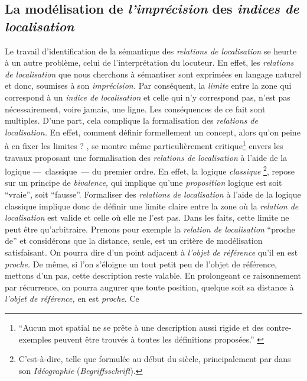 \subsection{La modélisation de \emph{l'imprécision} des \emph{indices
    de localisation}}
\label{subsec:2-1-2}

Le travail d'identification de la sémantique des \emph{relations de
  localisation} se heurte à un autre problème, celui de
l'interprétation du locuteur. En effet, les \emph{relations de
  localisation} que nous cherchons à sémantiser sont exprimées en
langage naturel et donc, soumises à son \emph{imprécision.} Par
conséquent, la \emph{limite} entre la zone qui correspond à un
\emph{indice de localisation} et celle qui n'y correspond pas, n'est
pas nécessairement, voire jamais, une ligne. Les conséquences de ce
fait sont multiples. D'une part, cela complique la formalisation des
\emph{relations de localisation.} En effet, comment définir
formellement un concept, alors qu'on peine à en fixer les limites ?
\textcite{Vandeloise1986}, se montre même particulièrement
critique\footnote{\enquote{Aucun mot spatial ne se prête à une
    description aussi rigide et des contre-exemples peuvent être
    trouvés à toutes les définitions proposées.}
  \autocite[p. 18]{Vandeloise1986}} envers les travaux proposant une
formalisation des \emph{relations de localisation} à l'aide de la
logique ---~classique~--- du premier ordre. En effet, la logique
\emph{classique} \footnote{C'est-à-dire, telle que formulée au début
  du  siècle, principalement par  dans son
  \emph{Idéographie} (\emph{Begriffsschrift}).}, repose sur un
principe de \emph{bivalence,} qui implique qu'une \emph{proposition}
logique est soit \enquote{vraie}, soit \enquote{fausse}. Formaliser
des \emph{relations de localisation} à l'aide de la logique classique
implique donc de définir une limite claire entre la zone où la
\emph{relation de localisation} est valide et celle où elle ne l'est
pas. Dans les faits, cette limite ne peut être qu'arbitraire. Prenons
pour exemple la \emph{relation de localisation} \enquote{proche de} et
considérons que la distance, seule, est un critère de modélisation
satisfaisant. On pourra dire d'un point adjacent à \emph{l'objet de
  référence} qu'il en est \emph{proche.} De même, si l'on s'éloigne un
tout petit peu de l'objet de référence, mettons d'un pas, cette
description reste valable. En prolongeant ce raisonnement par
récurrence, on pourra augurer que toute position, quelque soit sa
distance à \emph{l'objet de référence,} en est \emph{proche}. Ce
